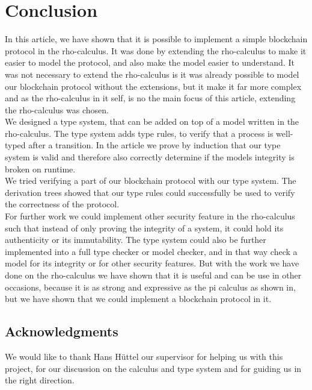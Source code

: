 \section{Conclusion}
In this article, we have shown that it is possible to implement a simple blockchain protocol in the rho-calculus. It was done by extending the rho-calculus to make it easier to model the protocol, and also make the model easier to understand. It was not necessary to extend the rho-calculus is it was already possible to model our blockchain protocol without the extensions, but it make it far more complex and as the rho-calculus in it self, is no the main focus of this article, extending the rho-calculus was chosen.\\
We designed a type system, that can be added on top of a model written in the rho-calculus. The type system adds type rules, to verify that a process is well-typed after a transition. In the article we prove by induction that our type system is valid and therefore also correctly determine if the models integrity is broken on runtime.\\
We tried verifying a part of our blockchain protocol with our type system. The derivation trees showed that our type rules could successfully be used to verify the correctness of the protocol.\\

For further work we could implement other security feature in the rho-calculus such that instead of only proving the integrity of a system, it could hold its authenticity or its immutability. The type system could also be further implemented into a full type checker or model checker, and in that way check a model for its integrity or for other security features. But with the work we have done on the rho-calculus we have shown that it is useful and can be use in other occasions, because it is as strong and expressive as the pi calculus as shown in\citep{Meredith2005}, but we have shown that we could implement a blockchain protocol in it.





\subsection*{Acknowledgments}
We would like to thank Hans Hüttel our supervisor for helping us with this project, for our discussion on the calculus and type system and for guiding us in the right direction.
